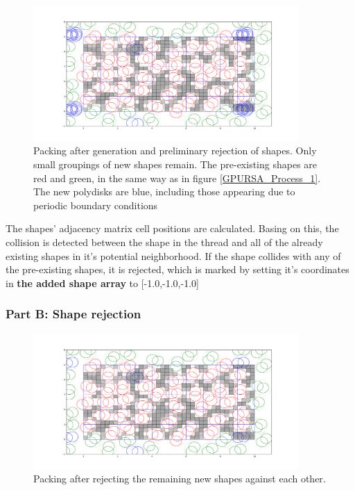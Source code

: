 \documentclass[12pt, oneside]{report}
\begin{document}

\begin{figure}[H]
  \centering
	\includegraphics[width=0.9\textwidth,keepaspectratio]{Images/GPURSA/Figure_3.pdf}
	\caption{Packing after generation and preliminary rejection of shapes. Only small groupings of new shapes remain. The pre-existing shapes are red and green, in the same way as in figure \ref{GPURSA_Process_1}. The new polydisks are blue, including those appearing due to periodic boundary conditions}
	\label{GPURSA_Process_2}
\end{figure}

The shapes' adjacency matrix cell positions are calculated. Basing on this, the collision is detected between the shape in the thread and all of the already existing shapes in it's potential neighborhood. If the shape collides with any of the pre-existing shapes, it is rejected, which is marked by setting it's coordinates in \textbf{the added shape array} to [-1.0,-1.0,-1.0]

\subsubsection{Part B: Shape rejection}

\begin{figure}[H]
  \centering
	\includegraphics[width=0.9\textwidth,keepaspectratio]{Images/GPURSA/Figure_4.pdf}
	\caption{Packing after rejecting the remaining new shapes against each other.}
	\label{GPURSA_Process_4}
\end{figure}
\end{document}
